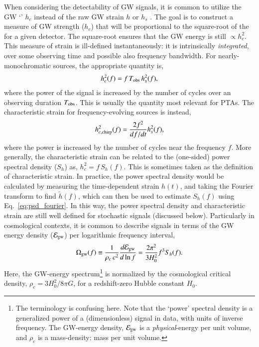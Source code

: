 \documentclass[onecolumn,authoryear]{els-mrw}
\begin{document}
When considering the detectability of GW signals, it is common to utilize the GW `' $h_c$ instead of the raw GW strain $h$ or $h_s$ \citep[for thorough discussions, see:][]{Flanagan+Hughes-1998, Moore+2015}.  The goal is to construct a measure of GW strength ($h_c$) that will be proportional to the square-root of the  for a given detector.  The square-root ensures that the GW energy is still $\propto h_c^2$.  This measure of strain is ill-defined instantaneously: it is intrinsically \textit{integrated}, over some observing time and possible also frequency bandwidth.  For nearly-monochromatic sources, the appropriate quantity is,
\begin{align}\label{eq:characterist_strain_mono}
    h_c^2(f) = f \, T_{\textrm{obs}} \, h_s^2(f),
\end{align}
where the power of the signal is increased by the number of cycles over an observing duration $T_{\textrm{obs}}$.  This is usually the quantity most relevant for PTAs.  The characteristic strain for frequency-evolving sources is instead,
\begin{align}\label{eq:characterist_strain_chirp}
    h_{c,\textrm{chirp}}^2(f) = \frac{2 f^2}{df/dt} h_s^2(f),
\end{align}
where the power is increased by the number of cycles near the frequency $f$.  More generally, the characteristic strain can be related to the (one-sided) power spectral density ($S_h$) as, $h_c^2 = f \, S_h(f)$.  This is sometimes taken as the definition of characteristic strain.  In practice, the power spectral density would be calculated by measuring the time-dependent strain $h(t)$, and taking the Fourier transform to find $\tilde{h}(f)$, which can then be used to estimate $S_h(f)$ using Eq.~\ref{eq:psd_fourier}.  In this way, the power spectral density and characteristic strain are still well defined for stochastic signals (discussed below).  Particularly in cosmological contexts, it is common to describe signals in terms of the GW energy density ($\mathcal{E}_{\textrm{gw}}$) per logarithmic frequency interval,
\begin{align}
    \Omega_{\textrm{gw}}(f) \equiv \frac{1}{\rho_c \, c^2} \frac{d \mathcal{E}_{\textrm{gw}}}{d \ln f} = \frac{2 \pi^2}{3 H_0^2} f^3 S_h(f).
\end{align}
Here, the GW-energy spectrum\footnote{The terminology is confusing here.  Note that the `power' spectral density is a generalized power of a (dimensionless) signal in data, with units of inverse frequency.  The GW-energy density, $\mathcal{E}_{\textrm{gw}}$ is a \textit{physical}-energy per unit volume, and $\rho_c$ is a mass-density: mass per unit volume.} is normalized by the cosmological critical density, $\rho_c = 3 H_0^2 / 8 \pi G$, for a redshift-zero Hubble constant $H_0$.
\end{document}
